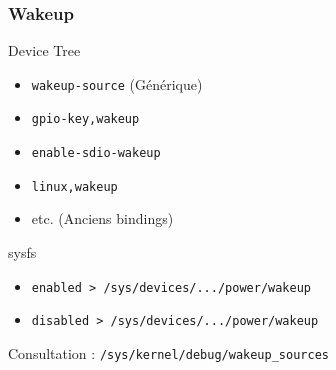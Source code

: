 \begin{frame}
	\frametitle{Wakeup}
	\begin{block}{Device Tree}
		\begin{itemize}
			\item \texttt{wakeup-source} (Générique)
			\item \texttt{gpio-key,wakeup}
			\item \texttt{enable-sdio-wakeup}
			\item \texttt{linux,wakeup}
			\item etc. (Anciens bindings)
		\end{itemize}
	\end{block}
	\begin{block}{sysfs}
		\begin{itemize}
			\item \texttt{enabled > /sys/devices/.../power/wakeup}
			\item \texttt{disabled > /sys/devices/.../power/wakeup}
		\end{itemize}
	\end{block}
	Consultation : \texttt{/sys/kernel/debug/wakeup\_sources}
\end{frame}



